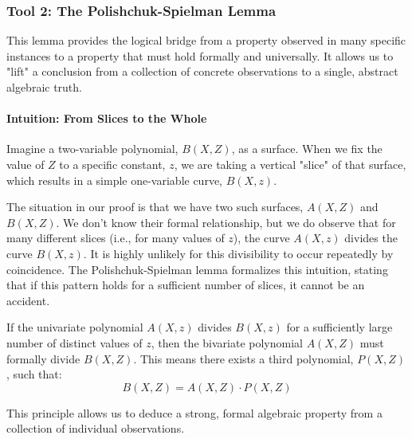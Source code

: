 \documentclass{article}
\begin{document}

\subsubsection{Tool 2: The Polishchuk-Spielman Lemma}
This lemma provides the logical bridge from a property observed in many specific instances to a property that must hold formally and universally. It allows us to "lift" a conclusion from a collection of concrete observations to a single, abstract algebraic truth.

\paragraph{Intuition: From Slices to the Whole}
Imagine a two-variable polynomial, $B(X,Z)$, as a surface. When we fix the value of $Z$ to a specific constant, $z$, we are taking a vertical "slice" of that surface, which results in a simple one-variable curve, $B(X,z)$.

The situation in our proof is that we have two such surfaces, $A(X,Z)$ and $B(X,Z)$. We don't know their formal relationship, but we do observe that for many different slices (i.e., for many values of $z$), the curve $A(X,z)$ divides the curve $B(X,z)$. It is highly unlikely for this divisibility to occur repeatedly by coincidence. The Polishchuk-Spielman lemma formalizes this intuition, stating that if this pattern holds for a sufficient number of slices, it cannot be an accident.

\begin{tcolorbox}[breakable, title={The Polishchuk-Spielman Lemma (Principle)}]
If the univariate polynomial $A(X,z)$ divides $B(X,z)$ for a sufficiently large number of distinct values of $z$, then the bivariate polynomial $A(X,Z)$ must formally divide $B(X,Z)$. This means there exists a third polynomial, $P(X,Z)$, such that:
\[ B(X,Z) = A(X,Z) \cdot P(X,Z) \]

\begin{center}
\end{center}
This principle allows us to deduce a strong, formal algebraic property from a collection of individual observations.
\end{tcolorbox}
\end{document}
